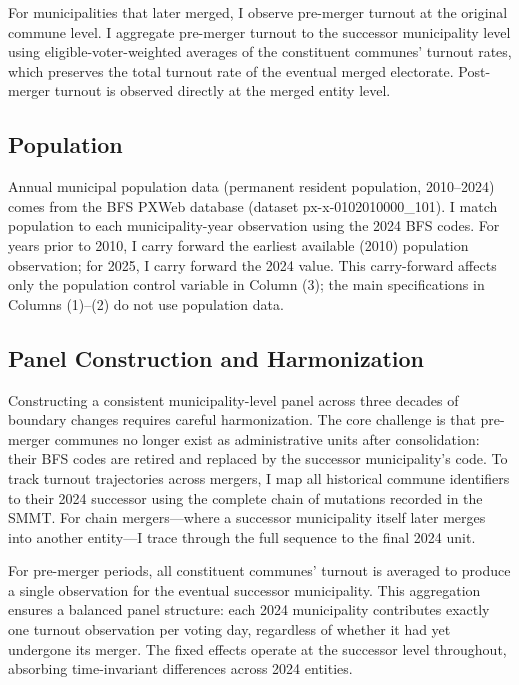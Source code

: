 \documentclass[12pt]{article}
\begin{document}
For municipalities that later merged, I observe pre-merger turnout at the original commune level. I aggregate pre-merger turnout to the successor municipality level using eligible-voter-weighted averages of the constituent communes' turnout rates, which preserves the total turnout rate of the eventual merged electorate. Post-merger turnout is observed directly at the merged entity level.

\subsection{Population}

Annual municipal population data (permanent resident population, 2010--2024) comes from the BFS PXWeb database (dataset px-x-0102010000\_101). I match population to each municipality-year observation using the 2024 BFS codes. For years prior to 2010, I carry forward the earliest available (2010) population observation; for 2025, I carry forward the 2024 value. This carry-forward affects only the population control variable in Column (3); the main specifications in Columns (1)--(2) do not use population data.

\subsection{Panel Construction and Harmonization}

Constructing a consistent municipality-level panel across three decades of boundary changes requires careful harmonization. The core challenge is that pre-merger communes no longer exist as administrative units after consolidation: their BFS codes are retired and replaced by the successor municipality's code. To track turnout trajectories across mergers, I map all historical commune identifiers to their 2024 successor using the complete chain of mutations recorded in the SMMT. For chain mergers---where a successor municipality itself later merges into another entity---I trace through the full sequence to the final 2024 unit.

For pre-merger periods, all constituent communes' turnout is averaged to produce a single observation for the eventual successor municipality. This aggregation ensures a balanced panel structure: each 2024 municipality contributes exactly one turnout observation per voting day, regardless of whether it had yet undergone its merger. The fixed effects operate at the successor level throughout, absorbing time-invariant differences across 2024 entities.
\end{document}
